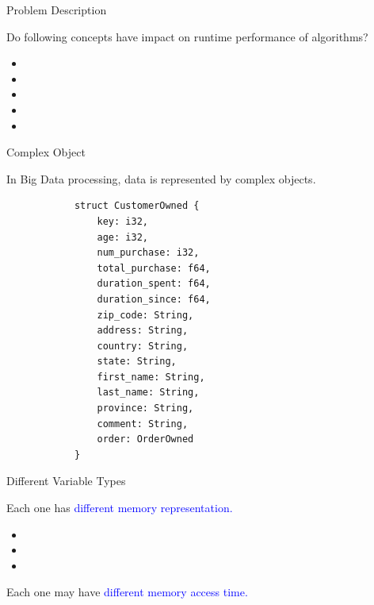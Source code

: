 \documentclass[9pt]{beamer}
\begin{document}

\begin{frame}[fragile]{Problem Description}

    
    Do following concepts have impact on runtime performance of algorithms?
    \begin{itemize}
        \item {} 
        \item {}
        \item {}
        \item {}
        \item {}
    \end{itemize}
\end{frame}


\begin{frame}[fragile]{Complex Object}

    In Big Data processing, data is represented by complex objects.
    
    \begin{minipage}[t]{0.2\linewidth}\centering
        \begin{lstlisting}
            struct CustomerOwned {
                key: i32,
                age: i32,
                num_purchase: i32,
                total_purchase: f64,
                duration_spent: f64, 
                duration_since: f64,
                zip_code: String,
                address: String,
                country: String,
                state: String,
                first_name: String,
                last_name: String,
                province: String,
                comment: String, 
                order: OrderOwned
            }
        \end{lstlisting}
    \end{minipage}\hfill
    
\end{frame}

\begin{frame}[fragile]{Different Variable Types}

    Each one has \textcolor{blue}{different memory representation.}
    \begin{itemize}
        \item {} 
        \item {}
        \item {}
    \end{itemize}

    Each one may have \textcolor{blue}{different memory access time.} 
\end{frame}
\end{document}
